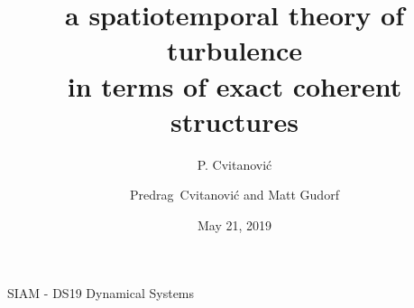




\usepackage[font=scriptsize, labelfont=bf]{caption}
\usepackage[
    backend=biber,  %
    sorting=nyt,
    style=numeric, %
    natbib=true,
    style=phys, %
    biblabel= brackets, %
    articletitle=false, %
    pageranges = true , %
    sortlocale=en_US,
    firstinits=true,
    url=false, %
    doi=false, %
    eprint=false
]{biblatex}


\renewcommand{\Ssym}[1]{{\ensuremath{m_{#1}}}}    %

\makeatletter
\let\@@magyar@captionfix\relax
\makeatother




\title{
{a spatiotemporal theory of}
{\huge turbulence}
    \\
{in terms of exact coherent structures}
}
\author{P. Cvitanovi\'c}
\author[Cvitanovi\'c]
{
  \textcolor{green!50!black}{
  {Predrag~Cvitanovi\'c
  and
  Matt Gudorf
  }	%
  }
}
\institute
{
{SIAM - DS19 Dynamical Systems}
 }
\date{May 21, 2019}

